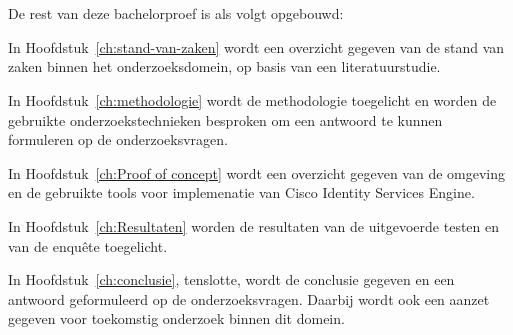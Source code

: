 \section{}
\label{sec:opzet-bachelorproef}


De rest van deze bachelorproef is als volgt opgebouwd:

In Hoofdstuk~\ref{ch:stand-van-zaken} wordt een overzicht gegeven van de stand van zaken binnen het onderzoeksdomein, op basis van een literatuurstudie.

In Hoofdstuk~\ref{ch:methodologie} wordt de methodologie toegelicht en worden de gebruikte onderzoekstechnieken besproken om een antwoord te kunnen formuleren op de onderzoeksvragen.

In Hoofdstuk~\ref{ch:Proof of concept} wordt een overzicht gegeven van de omgeving en de gebruikte tools voor implemenatie van Cisco Identity Services Engine. 

In Hoofdstuk~\ref{ch:Resultaten} worden de resultaten van de uitgevoerde testen en van de enquête toegelicht.

In Hoofdstuk~\ref{ch:conclusie}, tenslotte, wordt de conclusie gegeven en een antwoord geformuleerd op de onderzoeksvragen. Daarbij wordt ook een aanzet gegeven voor toekomstig onderzoek binnen dit domein.